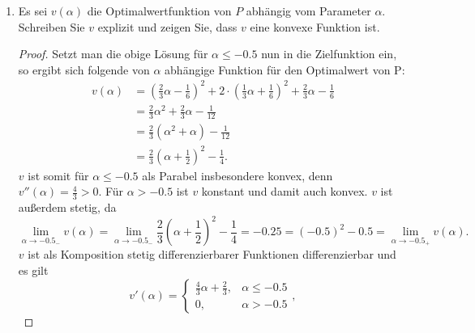 \documentclass[12pt]{extreport} %
\theoremstyle{named}
\theoremstyle{nnamed}
\theoremstyle{itshape}
\theoremstyle{normal}
\begin{document}
\begin{enumerate}
\begin{proof}
\begin{description}
			Unter Verwendung von Teilaufgabe a) und Satz 2.6.12 ist somit für $\alpha \leq - \frac{1}{2}$ 
			$$ \begin{pmatrix} x_1 \\ x_2\end{pmatrix} = \begin{pmatrix} \frac{2}{3}\alpha- \frac{1}{6} \\ \frac{1}{3}\alpha +\frac{1}{6} \end{pmatrix} 
			\text{ und für $\alpha > -\frac{1}{2}$ ist }
			\begin{pmatrix} x_1 \\ x_2\end{pmatrix} = \begin{pmatrix} -0.5 \\ 0 \end{pmatrix} $$
			globaler Minimalpunkt.
			\end{description}
		\end{proof}
	\item Es sei $v(\alpha)$ die Optimalwertfunktion von $P$ abhängig vom Parameter $\alpha$. Schreiben Sie $v$ explizit und zeigen Sie, dass $v$ eine konvexe Funktion ist.
		\begin{proof}
			Setzt man die obige Lösung für $\alpha \leq - 0.5$ nun in die Zielfunktion ein, so ergibt sich folgende von $\alpha$ abhängige Funktion für den Optimalwert von P:
			\begin{align*}
				v(\alpha) & = \left(\frac{2}{3}\alpha- \frac{1}{6} \right)^2 + 2 \cdot \left(\frac{1}{3}\alpha +\frac{1}{6} \right)^2+ \frac{2}{3} \alpha - \frac{1}{6} \\
				& = \frac{2}{3}\alpha^2+\frac{2}{3}\alpha - \frac{1}{12} \\
				& = \frac{2}{3} \left(\alpha^2 + \alpha \right) -\frac{1}{12} \\
				& = \frac{2}{3} \left(\alpha +\frac{1}{2} \right)^2-\frac{1}{4}.
			\end{align*}
			$v$ ist somit für $\alpha \leq - 0.5$ als Parabel insbesondere konvex, denn $v''(\alpha)=\frac{4}{3} > 0$. Für $\alpha > -0.5$ ist $v$ konstant und damit auch konvex. $v$ ist außerdem stetig, da 
			$$ \lim_{\alpha \rightarrow -0.5_{-}} v(\alpha) = \lim_{\alpha \rightarrow -0.5_{-}} \frac{2}{3} \left(\alpha +\frac{1}{2} \right)^2-\frac{1}{4} = - 0.25 = \left(-0.5 \right)^2 - 0.5 = \lim_{\alpha \rightarrow -0.5_{+}} v(\alpha). $$
			$v$ ist als Komposition stetig differenzierbarer Funktionen differenzierbar und es gilt
			$$ v'(\alpha) = \begin{cases} \frac{4}{3} \alpha + \frac{2}{3}, & \alpha \leq -0.5 \\ 0, & \alpha > -0.5\end{cases}, $$

\end{proof}
\end{enumerate}
\end{document}
